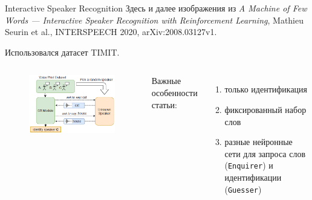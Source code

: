 \documentclass[aspectratio=43]{beamer}
\newcommand{\guesser}{\texttt{Guesser}}
\newcommand{\enquirer}{\texttt{Enquirer}}
\begin{document}
\begin{frame}{Interactive Speaker Recognition}
    Здесь и далее изображения из \textit{A Machine of Few Words --- Interactive
    Speaker Recognition with Reinforcement Learning}, Mathieu Seurin et al.,
    INTERSPEECH 2020, arXiv:2008.03127v1.\vspace{1em}

    Использовался датасет TIMIT\@.

    \begin{columns}

    \begin{figure}[bht]
        \includegraphics[width=.9\textwidth]{isr_game_large.png}
    \end{figure}

    Важные особенности статьи:
    \begin{enumerate}
        \item только идентификация
        \item фиксированный набор слов
        \item разные нейронные сети для запроса слов (\enquirer) и идентификации (\guesser)
    \end{enumerate}

    \end{columns}
\end{frame}
\end{document}
